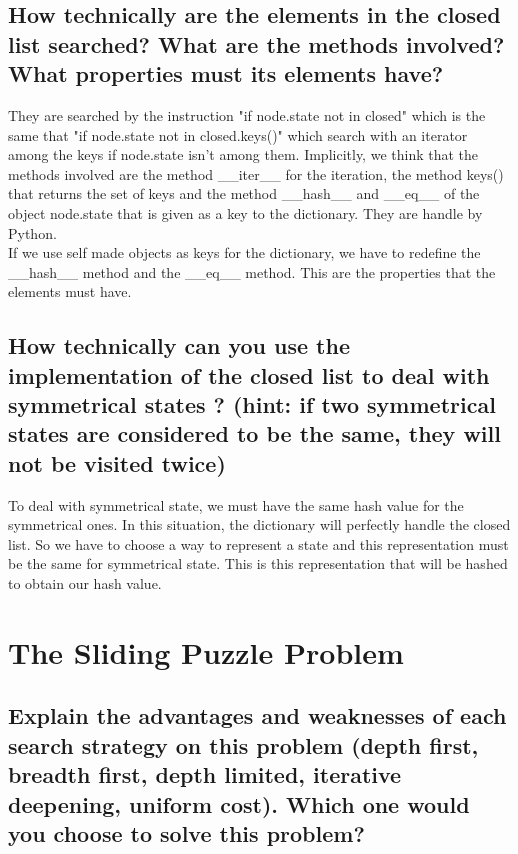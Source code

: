 \documentclass[a4paper,10pt]{article}
\begin{document}
	\subsection{How technically are the elements in the closed list searched? What are the
methods involved? What properties must its elements have?}
	
	They are searched by the instruction "if node.state not in closed" which is the same that "if node.state not in closed.keys()" which search with an iterator among the keys if node.state isn't among them. Implicitly, we think that the  methods involved are the method \_\_iter\_\_ for the iteration, the method keys() that returns the set of keys and the method \_\_hash\_\_ and \_\_eq\_\_ of the object node.state that is given as a key to the dictionary. They are handle by Python.\\
	If we use self made objects as keys for the dictionary, we have to redefine the \_\_hash\_\_ method and the \_\_eq\_\_ method. This are the properties that the elements must have.
	
	\subsection{How technically can you use the implementation of the closed list to deal with symmetrical states ? (hint: if two symmetrical states are considered to be the same, they will not be visited twice)}
	
	To deal with symmetrical state, we must have the same hash value for the symmetrical ones. In this situation, the dictionary will perfectly handle the closed list. So we have to choose a way to represent a state and this representation must be the same for symmetrical state. This is this representation that will be hashed to obtain our hash value.
	
\section{The Sliding Puzzle Problem}

	\subsection{Explain the advantages and weaknesses of each search strategy on this problem (depth first, breadth first, depth limited, iterative deepening, uniform cost). Which one would you choose to solve this problem?}
	
\end{document}

